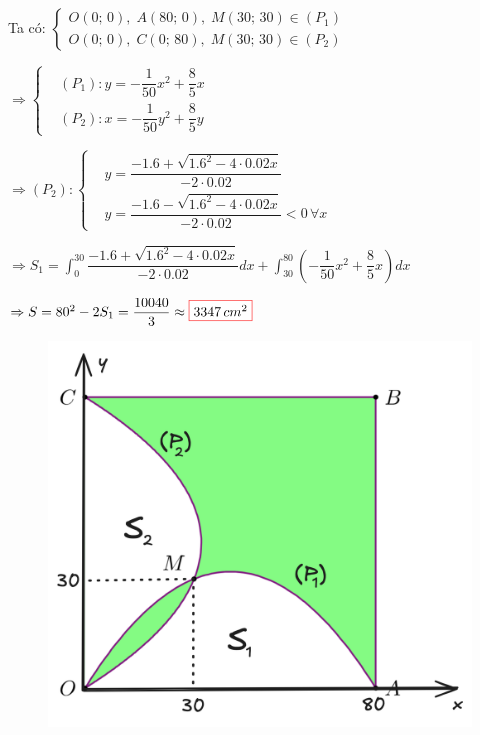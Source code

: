 \documentclass[twoside,final]{hcmut-report}
\newcommand{\result}[1]{\fcolorbox{red}{white}{#1}}
\begin{document}
\begin{minipage}{0.65\textwidth}
    Ta có: $
        \begin{cases}
            O(0;\,0),\; A(80;\,0),\; M(30;\,30) \in (P_1) \\
            O(0;\,0),\; C(0;\,80),\; M(30;\,30) \in (P_2)
        \end{cases}$\par
    $\Rightarrow
        \left\{\begin{aligned}
             & (P_1): y = -\dfrac{1}{50}x^2 + \dfrac{8}{5}x \\
             & (P_2): x = -\dfrac{1}{50}y^2 + \dfrac{8}{5}y
        \end{aligned}\right.$\par
    $\Rightarrow (P_2): \left\{\begin{aligned}
             & y = \dfrac{-1.6 + \sqrt{1.6^2 - 4\cdot 0.02x}}{-2\cdot 0.02}                 \\
             & y = \dfrac{-1.6 - \sqrt{1.6^2 - 4\cdot 0.02x}}{-2\cdot 0.02} < 0\, \forall x
        \end{aligned}\right.$\par
    $\Rightarrow S_1 = \displaystyle \int_{0}^{30}\dfrac{-1.6 + \sqrt{1.6^2 - 4\cdot 0.02x}}{-2\cdot 0.02} dx + \displaystyle \int_{30}^{80}(-\dfrac{1}{50}x^2 + \dfrac{8}{5}x)dx$\par
    $\Rightarrow S = 80^2 - 2S_1 = \dfrac{10040}{3} \approx \result{$3347\,cm^2$}$
\end{minipage}
\begin{minipage}{0.25\textwidth}
    \begin{figure}[H]
        \includegraphics[width=1.6\textwidth]{images/Ứng dụng tích phân/NBK-4-solve.png}
    \end{figure}
\end{minipage}
\end{document}
